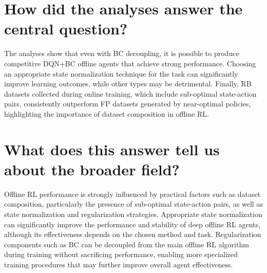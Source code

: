 \section{How did the analyses answer the central question?}
The analyses show that even with BC decoupling, it is possible to produce competitive DQN+BC offline agents that achieve strong performance. Choosing an appropriate state normalization technique for the task can significantly improve learning outcomes, while other types may be detrimental. Finally, RB datasets collected during online training, which include sub-optimal state-action pairs, consistently outperform FP datasets generated by near-optimal policies, highlighting the importance of dataset composition in offline RL.

 
\section{What does this answer tell us about the broader field?}
Offline RL performance is strongly influenced by practical factors such as dataset composition, particularly the presence of sub-optimal state-action pairs, as well as state normalization and regularization strategies. Appropriate state normalization can significantly improve the performance and stability of deep offline RL agents, although its effectiveness depends on the chosen method and task. Regularization components such as BC can be decoupled from the main offline RL algorithm during training without sacrificing performance, enabling more specialized training procedures that may further improve overall agent effectiveness.